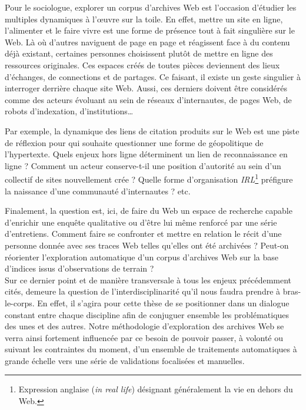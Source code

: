 \documentclass[symmetric,justified,marginals=raggedouter]{tufte-book}
\begin{document}
\noindent Pour le sociologue, explorer un corpus d'archives Web est l'occasion d'étudier les multiples dynamiques à l'œuvre sur la toile. En effet, mettre un site en ligne, l'alimenter et le faire vivre est une forme de présence tout à fait singulière sur le Web. Là où d'autres naviguent de page en page et réagissent face à du contenu déjà existant, certaines personnes choisissent plutôt de mettre en ligne des ressources originales. Ces espaces créés de toutes pièces deviennent des lieux d'échanges, de connections et de partages. Ce faisant, il existe un geste singulier à interroger derrière chaque site Web. Aussi, ces derniers doivent être considérés comme des acteurs évoluant au sein de réseaux d'internautes, de pages Web, de robots d'indexation, d'institutions\ldots{} 

Par exemple, la dynamique des liens de citation produits sur le Web est une piste de réflexion pour qui souhaite questionner une forme de géopolitique de l'hypertexte. Quels enjeux hors ligne déterminent un lien de reconnaissance en ligne ? Comment un acteur conserve-t-il une position d'autorité au sein d'un collectif de sites nouvellement crée ? Quelle forme d'organisation \textit{IRL}\footnote{Expression anglaise (\textit{in real life}) désignant généralement la vie en dehors du Web.} préfigure la naissance d'une communauté d'internautes ? etc. 

Finalement, la question est, ici, de faire du Web un espace de recherche capable d'enrichir une enquête qualitative ou d'être lui même renforcé par une série d'entretiens. Comment faire se confronter et mettre en relation le récit d'une personne donnée avec ses traces Web telles qu'elles ont été archivées ? Peut-on réorienter l'exploration automatique d'un corpus d'archives Web sur la base d'indices issus d'observations de terrain ?\\

\noindent Sur ce dernier point et de manière transversale à tous les enjeux précédemment cités, demeure la question de l'interdisciplinarité qu'il nous faudra prendre à bras-le-corps. En effet, il s'agira pour cette thèse de se positionner dans un dialogue constant entre chaque discipline afin de conjuguer ensemble les problématiques des unes et des autres. Notre méthodologie d'exploration des archives Web se verra ainsi fortement influencée par ce besoin de pouvoir passer, à volonté ou suivant les contraintes du moment, d'un ensemble de traitements automatiques à grande échelle vers une série de validations focalisées et manuelles. 
\end{document}

